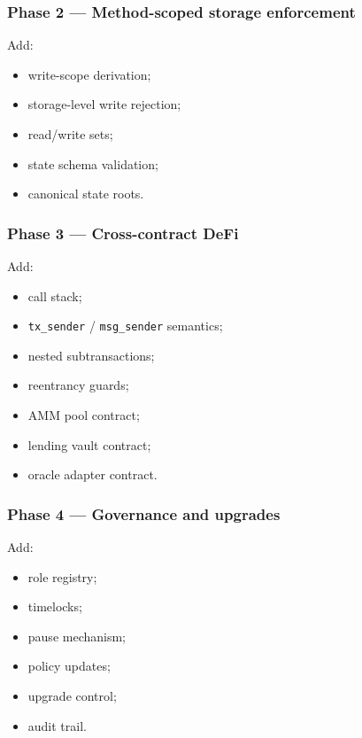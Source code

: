 \documentclass[11pt]{article}
\newcommand{\code}[1]{\texttt{#1}}
\begin{document}
\subsubsection{Phase 2 --- Method-scoped storage enforcement}

Add:

\begin{itemize}
  \item write-scope derivation;
  \item storage-level write rejection;
  \item read/write sets;
  \item state schema validation;
  \item canonical state roots.
\end{itemize}

\subsubsection{Phase 3 --- Cross-contract DeFi}

Add:

\begin{itemize}
  \item call stack;
  \item \code{tx\_sender} / \code{msg\_sender} semantics;
  \item nested subtransactions;
  \item reentrancy guards;
  \item AMM pool contract;
  \item lending vault contract;
  \item oracle adapter contract.
\end{itemize}

\subsubsection{Phase 4 --- Governance and upgrades}

Add:

\begin{itemize}
  \item role registry;
  \item timelocks;
  \item pause mechanism;
  \item policy updates;
  \item upgrade control;
  \item audit trail.
\end{itemize}
\end{document}
